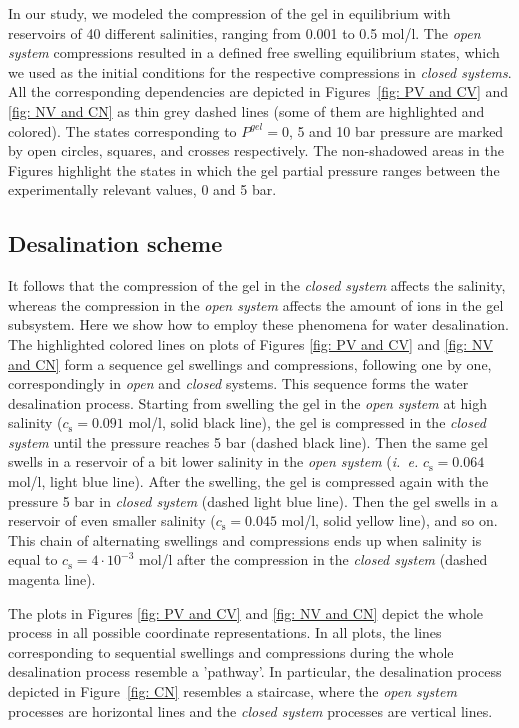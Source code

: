 \documentclass[journal,article,submit,pdftex,moreauthors]{Definitions/mdpi}
\newcommand{\ie}{\textit{i.~e.} }
\newcommand{\cs}{c_{\mathrm{s}}}
\begin{document}
In our study, we modeled the compression of the gel in equilibrium with reservoirs of 40 different salinities, ranging from 0.001 to 0.5 mol/l. 
The \emph{open system} compressions resulted in a defined free swelling equilibrium states,
which we used as the initial conditions for the respective compressions in \emph{closed systems}. 
All the corresponding dependencies are depicted in Figures~\ref{fig: PV and CV} and \ref{fig: NV and CN} as thin grey dashed lines (some of them are highlighted and colored).
The states corresponding to $P^{gel}=0$, 5 and 10 bar pressure are marked by open circles, squares, and crosses respectively. 
The non-shadowed areas in the Figures highlight the states in which the gel partial pressure ranges between the experimentally relevant values, 0 and 5 bar.

\subsection{Desalination scheme}
It follows that the compression of the gel in the \emph{closed system} affects the salinity, whereas the compression in the \emph{open system} affects the amount of ions in the gel subsystem. 
Here we show how to employ these phenomena for water desalination. 
The highlighted colored lines on plots of Figures \ref{fig: PV and CV} and \ref{fig: NV and CN} form a sequence gel swellings and compressions, following one by one, correspondingly in \emph{open} and \emph{closed} systems. 
This sequence forms the water desalination process.
Starting from swelling the gel in the \emph{open system} at high salinity ($\cs=0.091$ mol/l, solid black line), the gel is compressed in the \emph{closed system} until the pressure reaches 5 bar (dashed black line). 
Then the same gel swells in a reservoir of a bit lower salinity in the \emph{open system} (\ie $\cs=0.064$ mol/l, light blue line). 
After the swelling, the gel is compressed again with the pressure 5 bar in \emph{closed system} (dashed light blue line).  
Then the gel swells in a reservoir of even smaller salinity ($\cs=0.045$ mol/l, solid yellow line), and so on. 
This chain of alternating swellings and compressions ends up when salinity is equal to $\cs=4\cdot10^{-3}$ mol/l after the compression in the \emph{closed system} (dashed magenta line).

The plots in Figures \ref{fig: PV and CV} and \ref{fig: NV and CN} depict the whole process in all possible coordinate representations.
In all plots, the lines corresponding to sequential swellings and compressions during the whole desalination process resemble a 'pathway'.
In particular, the desalination process depicted in Figure~\ref{fig: CN} resembles a staircase,
where the \emph{open system} processes are horizontal lines and the \emph{closed system} processes are vertical lines.
\end{document}
